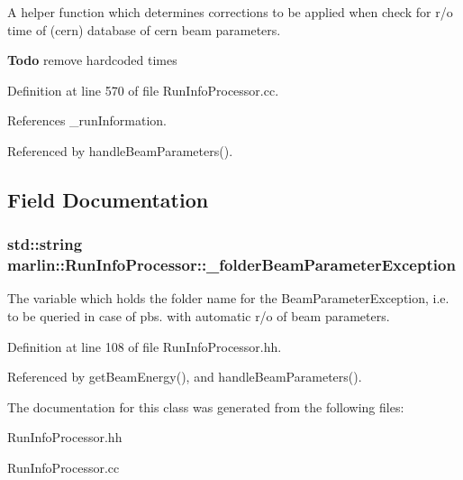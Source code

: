 A helper function which determines corrections to be applied when check for r/o time of (cern) database of cern beam parameters. \begin{Desc}
\item[{\bf Todo}]remove hardcoded times \end{Desc}


Definition at line 570 of file RunInfoProcessor.cc.

References \_\-runInformation.

Referenced by handleBeamParameters().

\subsection{Field Documentation}
\subsubsection[{\_\-folderBeamParameterException}]{\setlength{\rightskip}{0pt plus 5cm}std::string {\bf marlin::RunInfoProcessor::\_\-folderBeamParameterException}\hspace{0.3cm}{\ttfamily  [private]}}\label{classmarlin_1_1RunInfoProcessor_a36e4d01591a54d222092bd583b231f56}


The variable which holds the folder name for the BeamParameterException, i.e. to be queried in case of pbs. with automatic r/o of beam parameters. 

Definition at line 108 of file RunInfoProcessor.hh.

Referenced by getBeamEnergy(), and handleBeamParameters().

The documentation for this class was generated from the following files:\begin{DoxyCompactItemize}
\item 
RunInfoProcessor.hh\item 
RunInfoProcessor.cc\end{DoxyCompactItemize}
